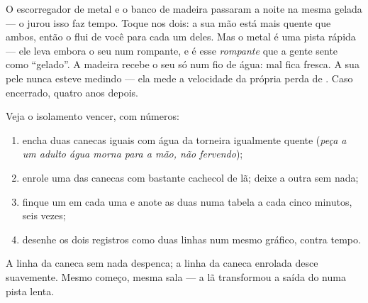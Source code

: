 \begin{example}\label{ex:g5:heat-and-insulation:slide}
O escorregador de metal e o banco de madeira passaram a noite na
mesma  gelada --- o  jurou isso faz tempo. Toque
nos dois: a sua mão está mais quente que ambos, então o  flui de
você para cada um deles. Mas o metal é uma pista rápida --- ele leva
embora o seu  num rompante, e é esse \emph{rompante} que a gente
sente como ``gelado''. A madeira recebe o seu  só num fio de
água: mal fica fresca. A sua pele nunca esteve medindo 
--- ela mede a velocidade da própria perda de . Caso encerrado,
quatro anos depois.
\end{example}

\begin{method}\label{met:g5:heat-and-insulation:race}
Veja o isolamento vencer, com números:
\begin{enumerate}
  \item encha duas canecas iguais com água da torneira igualmente
        quente (\emph{peça a um adulto água morna para a mão, não
        fervendo});
  \item enrole uma das canecas com bastante cachecol de lã; deixe a
        outra sem nada;
  \item finque um  em cada uma e anote as duas 
        numa tabela a cada cinco minutos, seis vezes;
  \item desenhe os dois registros como duas linhas num mesmo gráfico,
         contra tempo.
\end{enumerate}
A linha da caneca sem nada despenca; a linha da caneca enrolada desce
suavemente. Mesmo começo, mesma sala --- a lã transformou a saída do
 numa pista lenta.
\end{method}

